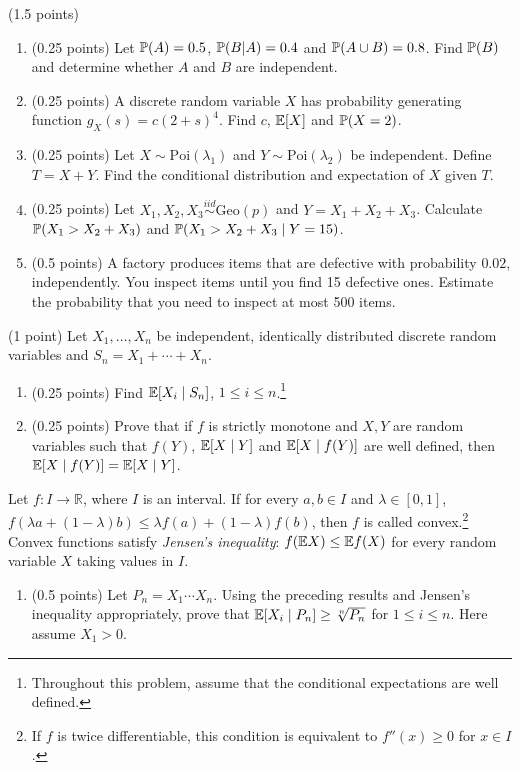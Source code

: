 \documentclass[a4paper]{report}
\begin{document}
\begin{problem} (1.5 points)~
\begin{enumerate}
\item (0.25 points) Let $\P(A)=0.5$, $\P(B|A)=0.4$ and $\P(A\cup B)=0.8$. Find $\P(B)$ and determine whether $A$ and $B$ are independent.
\item (0.25 points) A discrete random variable $X$ has probability generating function $g_X(s)=c(2+s)^4$. Find $c$, $\E[X]$ and $\P(X=2)$.
\item (0.25 points) Let $X\sim\mathrm{Poi}(\lambda_1)$ and $Y\sim\mathrm{Poi}(\lambda_2)$ be independent. Define $T=X+Y$. Find the conditional distribution and expectation of $X$ given $T$.
\item (0.25 points) Let $X_1,X_2,X_3\overset{iid}{\sim}\mathrm{Geo}(p)$ and $Y=X_1+X_2+X_3$. Calculate $\P(X_1>X_2+X_3)$ and $\P(X_1>X_2+X_3\mid Y=15)$.
\item (0.5 points) A factory produces items that are defective with probability $0.02$, independently. You inspect items until you find 15 defective ones. Estimate the probability that you need to inspect at most 500 items.
\end{enumerate}
\end{problem}
\begin{problem} (1 point)
Let $X_1,\ldots,X_n$ be independent, identically distributed discrete random variables and $S_n=X_1+\cdots+X_n$.
\begin{enumerate}
\item (0.25 points) Find $\E[X_i\mid S_n]$, $1\leq i\leq n$.\footnote{Throughout this problem, assume that the conditional expectations are well defined.}
\item (0.25 points) Prove that if $f$ is strictly monotone and $X,Y$ are random variables such that $f(Y)$, $\E[X\mid Y]$ and $\E[X\mid f(Y)]$ are well defined, then $\E[X\mid f(Y)]=\E[X\mid Y]$.
\end{enumerate}
Let $f:I\to\mathbb R$, where $I$ is an interval. If for every $a,b\in I$ and $\lambda\in[0,1]$,
$f(\lambda a+(1-\lambda)b)\leq\lambda f(a)+(1-\lambda)f(b)$, then $f$ is called convex.\footnote{If $f$ is twice differentiable, this condition is equivalent to $f''(x)\geq0$ for $x\in I$.} Convex functions satisfy \emph{Jensen's inequality}: $f(\E X)\leq\E f(X)$ for every random variable $X$ taking values in $I$.
\begin{enumerate}[start=3]
\item (0.5 points) Let $P_n=X_1\cdots X_n$. Using the preceding results and Jensen's inequality appropriately, prove that $\E[X_i\mid P_n]\geq\sqrt[n]{P_n}$ for $1\leq i\leq n$. Here assume $X_1>0$.
\end{enumerate}
\end{problem}
\end{document}
